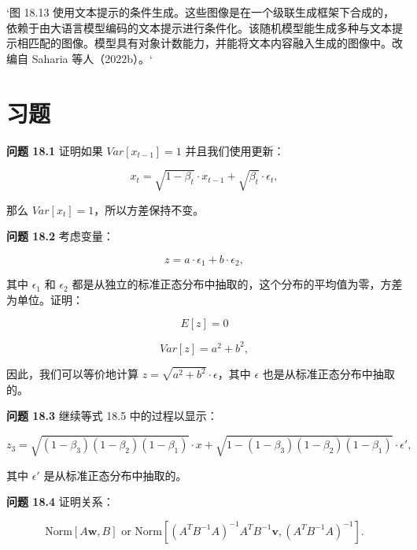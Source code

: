 `图 18.13 使用文本提示的条件生成。这些图像是在一个级联生成框架下合成的，依赖于由大语言模型编码的文本提示进行条件化。该随机模型能生成多种与文本提示相匹配的图像。模型具有对象计数能力，并能将文本内容融入生成的图像中。改编自 Saharia 等人（2022b）。`

\section{习题}
\textbf{问题 18.1} 证明如果 \(Var[x_{t-1}] = 1\) 并且我们使用更新：

\begin{equation}
x_t = \sqrt{1 - \beta_t} \cdot x_{t-1} + \sqrt{\beta_t} \cdot \epsilon_t, 
\end{equation}

那么 \(Var[x_t] = 1\)，所以方差保持不变。

\textbf{问题 18.2} 考虑变量：

\begin{equation}
z = a \cdot \epsilon_1 + b \cdot \epsilon_2, 
\end{equation}

其中 \(\epsilon_1\) 和 \(\epsilon_2\) 都是从独立的标准正态分布中抽取的，这个分布的平均值为零，方差为单位。证明：

\begin{equation}
E[z] = 0
\end{equation}

\begin{equation}
Var[z] = a^2 + b^2, 
\end{equation}

因此，我们可以等价地计算 \(z = \sqrt{a^2 + b^2} \cdot \epsilon\)，其中 \(\epsilon\) 也是从标准正态分布中抽取的。

\textbf{问题 18.3} 继续等式 18.5 中的过程以显示：

\begin{equation}
z_3 = \sqrt{(1 - \beta_3)(1 - \beta_2)(1 - \beta_1)} \cdot x + \sqrt{1 - (1 - \beta_3)(1 - \beta_2)(1 - \beta_1)} \cdot \epsilon', 
\end{equation}

其中 \(\epsilon'\) 是从标准正态分布中抽取的。

\textbf{问题 18.4} 证明关系：

\begin{equation}
\text{Norm}[A\mathbf{w}, B] \text{ or Norm} \left[ (A^T B^{-1} A)^{-1} A^T B^{-1}\mathbf{v}, (A^T B^{-1} A)^{-1} \right]. 
\end{equation}

